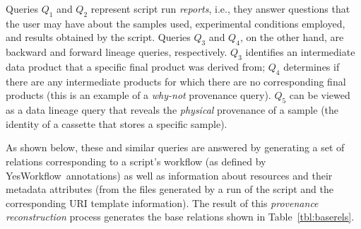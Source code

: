 \documentclass[nocopyrightspace]{sigplanconf}
\newcommand{\YW}{\textsf{YesWorkflow}}
\begin{document}
Queries $Q_1$ and $Q_2$ represent script run \emph{reports}, i.e.,
they answer questions that the user may have about the samples used,
experimental conditions employed, and results obtained by the script.
Queries $Q_3$ and $Q_4$, on the other hand, are backward and forward
lineage queries, respectively. $Q_3$ identifies an intermediate data
product that a specific final product was derived from; $Q_4$
determines if there are any intermediate products for which there are
no corresponding final products (this is an example of a
\emph{why-not} provenance query). $Q_5$ can be viewed as a data
lineage query that reveals the \emph{physical} provenance of a sample
(the identity of a cassette that stores a specific sample).

As shown below, these and similar queries are answered by generating a
set of relations corresponding to a script's workflow (as defined by
\YW\ annotations) as well as information about resources and their
metadata attributes (from the files generated by a run of the script
and the corresponding URI template information). The result of this
\emph{provenance reconstruction} process generates the base relations
shown in Table~\ref{tbl:baserels}.
\end{document}
